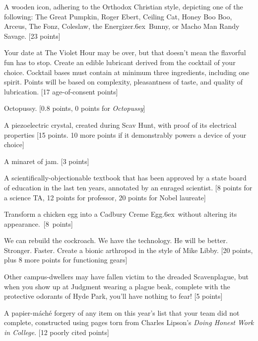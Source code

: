 \documentclass{book}
\def\tr{\raise.6ex\hbox{\scriptsize \textregistered}}
\begin{document}
\begin{list}{}{}
\newpage


\item A wooden icon, adhering to the Orthodox Christian style, depicting one of the following: The Great Pumpkin, Roger Ebert, Ceiling Cat, Honey Boo Boo, Arceus, The Fonz, Coleslaw, the Energizer\tr\ Bunny, or Macho Man Randy Savage. [23 points]

\item Your date at The Violet Hour may be over, but that doesn't mean the flavorful fun has to stop. Create an edible lubricant derived from the cocktail of your choice. Cocktail bases must contain at minimum three ingredients, including one spirit. Points will be based on complexity, pleasantness of taste, and quality of lubrication. [17 age-of-consent points]

\item Octopussy. [0.8 points, 0 points for \emph{Octopussy}] 

\item A piezoelectric crystal, created during Scav Hunt, with proof of its electrical properties [15 points. 10 more points if it demonstrably powers a device of your choice] 

\item A minaret of jam. [3 points]

\item A scientifically-objectionable  textbook that has been approved by a state board of education in the last ten years, annotated by an enraged scientist. [8 points for a science TA, 12 points for professor, 20 points for Nobel laureate] 

\item Transform a chicken egg into a Cadbury Creme Egg\tr\ without altering its appearance.\ [8~points]

\item We can rebuild the cockroach. We have the technology. He will be better. Stronger. Faster. Create a bionic arthropod in the style of Mike Libby. [20 points, plus 8 more points for functioning gears]

\item Other campus-dwellers may have fallen victim to the dreaded Scavenplague, but when you show up at Judgment wearing a plague beak, complete with the protective odorants of Hyde Park, you'll have nothing to fear! [5 points]

\item A papier-m\'{a}ch\'{e} forgery of any item on this year's list that your team did not complete, constructed using pages torn from Charles Lipson's 
\emph{Doing Honest Work in College}. [12 poorly cited points]


\end{list}
\end{document}
